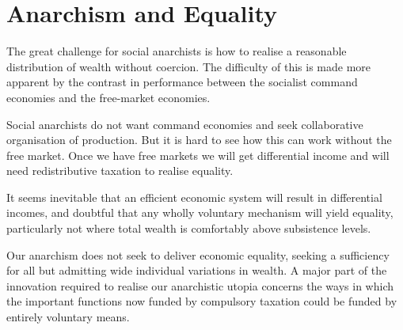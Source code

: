 \section{Anarchism and Equality}

The great challenge for social anarchists is how to realise a reasonable distribution of wealth without coercion.
The difficulty of this is made more apparent by the contrast in performance between the socialist command economies and the free-market economies.

Social anarchists do not want command economies and seek collaborative organisation of production.
But it is hard to see how this can work without the free market.
Once we have free markets we will get differential income and will need redistributive taxation to realise equality.

It seems inevitable that an efficient economic system will result in differential incomes, and doubtful that any wholly voluntary mechanism will yield equality, particularly not where total wealth is comfortably above subsistence levels.

Our anarchism does not seek to deliver economic equality, seeking a sufficiency for all but admitting wide individual variations in wealth.
A major part of the innovation required to realise our anarchistic utopia concerns the ways in which the important functions now funded by compulsory taxation could be funded by entirely voluntary means.
 